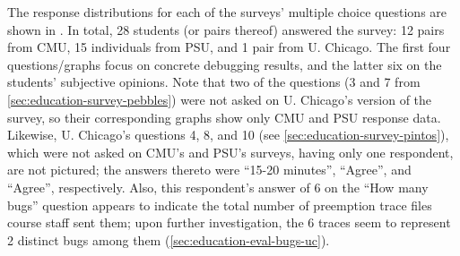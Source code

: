 
The response distributions for each of the surveys' multiple choice questions
are shown in .
In total, 28 students (or pairs thereof) answered the survey:
12 pairs from CMU, 15 individuals from PSU, and 1 pair from U. Chicago.
The first four questions/graphs focus on concrete debugging results,
and the latter six on the students' subjective opinions.
%
Note that two of the questions
(3 and 7 from \cref{sec:education-survey-pebbles})
were not asked on U. Chicago's version of the survey,
so their corresponding graphs show only CMU and PSU response data.
Likewise, U. Chicago's questions 4, 8, and 10
(see \cref{sec:education-survey-pintos}),
which were not asked on CMU's and PSU's surveys,
having only one respondent,
are not pictured;
the answers thereto were ``15-20 minutes'', ``Agree'', and ``Agree'', respectively.
Also, this respondent's answer of 6 on the ``How many bugs'' question
appears to indicate the total number of preemption trace files course staff sent them;
upon further investigation,
the 6 traces seem to represent 2 distinct bugs among them (\cref{sec:education-eval-bugs-uc}).

